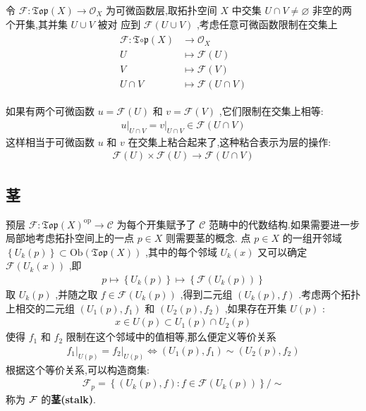令 $\mathscr{F}: \mathfrak{T o p}(X) \rightarrow \mathcal{O}_X$ 为可微函数层,取拓扑空间 $X$ 中交集 $U \cap V \neq \varnothing$ 非空的两个开集,其并集 $U \cup V$ 被对 应到 $\mathscr{F}(U \cup V)$ ,考虑任意可微函数限制在交集上
\begin{align*}
\begin{aligned}
\mathscr{F}: \mathfrak{T} \mathfrak{\circ p}(X) & \rightarrow \mathcal{O}_X \\
U & \mapsto \mathscr{F}(U) \\
V & \mapsto \mathscr{F}(V) \\
U \cap V & \mapsto \mathscr{F}(U \cap V)
\end{aligned}
\end{align*}

如果有两个可微函数 $u=\mathscr{F}(U)$ 和 $v=\mathscr{F}(V)$ ,它们限制在交集上相等:
\begin{align*}
\left.u\right|_{U \cap V}=\left.v\right|_{U \cap V} \in \mathscr{F}(U \cap V)
\end{align*}
这样相当于可微函数 $u$ 和 $v$ 在交集上粘合起来了,这种粘合表示为层的操作:
\begin{align*}
\mathscr{F}(U) \times \mathscr{F}(U) \rightarrow \mathscr{F}(U \cap V)
\end{align*}
\subsection{茎}
预层 $\mathscr{F}: \mathfrak{T o p}(X)^{\mathrm{op}} \rightarrow \mathcal{C}$ 为每个开集赋予了 $\mathcal{C}$ 范畴中的代数结构.如果需要进一步局部地考虑拓扑空间上的一点 $p \in X$ 则需要茎的概念.
点 $p \in X$ 的一组开邻域 $\left\{U_k(p)\right\} \subset \mathrm{Ob}(\mathfrak{T} \mathfrak{o p}(X))$ ,其中的每个邻域 $U_k(x)$ 又可以确定 $\mathscr{F}\left(U_k(x)\right)$ ,即
\begin{align*}
p \mapsto\left\{U_k(p)\right\} \mapsto\left\{\mathscr{F}\left(U_k(p)\right)\right\}
\end{align*}
取 $U_k(p)$ ,并随之取 $f \in \mathscr{F}\left(U_k(p)\right)$ ,得到二元组 $\left(U_k(p), f\right)$ .考虑两个拓扑上相交的二元组 $\left(U_1(p), f_1\right)$ 和 $\left(U_2(p), f_2\right)$ ,如果存在开集 $U(p)$ :
\begin{align*}
x \in U(p) \subset U_1(p) \cap U_2(p)
\end{align*}
使得 $f_1$ 和 $f_2$ 限制在这个邻域中的值相等,那么便定义等价关系
\begin{align*}
\left.f_1\right|_{U(p)}=\left.f_2\right|_{U(p)} \Leftrightarrow\left(U_1(p), f_1\right) \sim\left(U_2(p), f_2\right)
\end{align*}
根据这个等价关系,可以构造商集:
\begin{align*}
\mathscr{F}_p=\left\{\left(U_k(p), f\right): f \in \mathscr{F}\left(U_k(p)\right)\right\} / \sim
\end{align*}
称为 ${\mathcal F}$ 的\textbf{茎(stalk)}.

